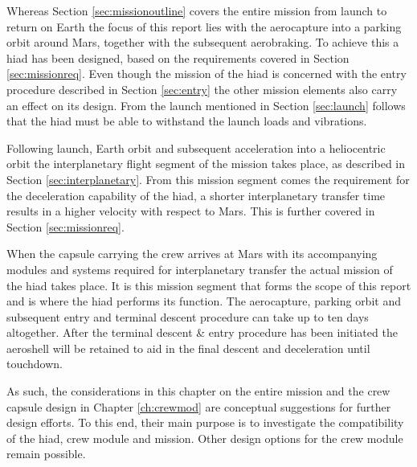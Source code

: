 Whereas Section \ref{sec:missionoutline} covers the entire mission from launch to return on Earth the focus of this report lies with the aerocapture into a parking orbit around Mars, together with the subsequent aerobraking. To achieve this a \gls{hiad} has been designed, based on the requirements covered in Section \ref{sec:missionreq}. Even though the mission of the \gls{hiad} is concerned with the entry procedure described in Section \ref{sec:entry} the other mission elements also carry an effect on its design. From the launch mentioned in Section \ref{sec:launch} follows that the \gls{hiad} must be able to withstand the launch loads and vibrations. 

Following launch, Earth orbit and subsequent acceleration into a heliocentric orbit the interplanetary flight segment of the mission takes place, as described in Section \ref{sec:interplanetary}. From this mission segment comes the requirement for the deceleration capability of the \gls{hiad}, a shorter interplanetary transfer time results in a higher velocity with respect to Mars. This is further covered in Section \ref{sec:missionreq}. 

When the capsule carrying the crew arrives at Mars with its accompanying modules and systems required for interplanetary transfer the actual mission of the \gls{hiad} takes place. It is this mission segment that forms the scope of this report and is where the \gls{hiad} performs its function. The aerocapture, parking orbit and subsequent entry and terminal descent procedure can take up to ten days altogether. After the terminal descent \& entry procedure has been initiated the aeroshell will be retained to aid in the final descent and deceleration until touchdown.

As such, the considerations in this chapter on the entire mission and the crew capsule design in Chapter \ref{ch:crewmod} are conceptual suggestions for further design efforts. To this end, their main purpose is to investigate the compatibility of the \gls{hiad}, crew module and mission. Other design options for the crew module remain possible.